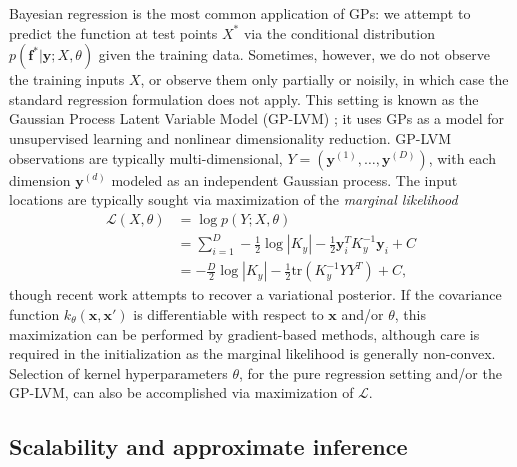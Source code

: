 \documentclass{article}
\newcommand{\tr}{\text{tr}}
\renewcommand{\v}[1]{\mathbf{#1}}
\begin{document}
Bayesian regression \cite{rasmussen2006} is the most common application of GPs: we attempt to predict the
function at test points $X^*$ via the conditional distribution
$p(\v{f}^* | \v{y}; X, \theta)$ given the training data. Sometimes, however, we do not observe the training inputs $X$, or
observe them only partially or noisily, in which case the standard regression
formulation does not apply. This setting is known as the Gaussian Process
Latent Variable Model (GP-LVM)  \cite{lawrence2004gaussian}; it uses
GPs as a model for unsupervised
  learning and nonlinear dimensionality reduction. GP-LVM
  observations are typically multi-dimensional, $Y = (\v{y}^{(1)}, \ldots,
  \v{y}^{(D)})$, with each dimension $\v{y}^{(d)}$ modeled as an
  independent Gaussian process. The input locations are typically sought via maximization of the {\em marginal likelihood}
\begin{align}
\mathcal{L}(X, \theta) &= \log p(Y ; X, \theta) \nonumber\\
&= \sum_{i=1}^D -\frac{1}{2}\log |K_y| - \frac{1}{2} \v{y}_i^T K_y^{-1} \v{y}_i + C\nonumber\\
&= -\frac{D}{2}\log |K_y| - \frac{1}{2}\tr(K_y^{-1} YY^T) + C,\label{eqn:mlik}
\end{align}
though recent work \citep{titsias2010bayesian,
  damianou2014} attempts to recover a variational posterior. If the
covariance function $k_\theta(\v{x}, \v{x}')$ is differentiable
with respect to $\v{x}$ and/or $\theta$, this maximization can be
performed by gradient-based methods, although care is required in the
initialization as the marginal likelihood is generally non-convex.
Selection of kernel hyperparameters $\theta$, for the pure regression setting and/or the
GP-LVM, can also be accomplished via maximization of $\mathcal{L}$.

\subsection{Scalability and approximate inference}
\label{sec:approx}
\end{document}
